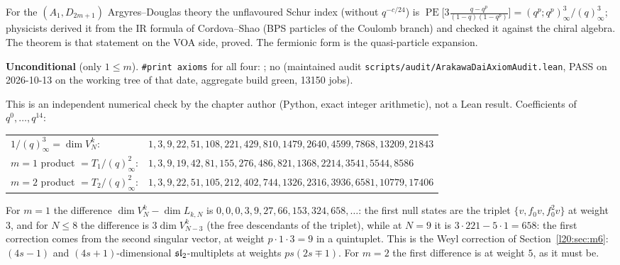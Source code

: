 \begin{physics}
For the $(A_1,D_{2m+1})$ Argyres--Douglas theory the unflavoured Schur index (without $q^{-c/24}$) is
$\operatorname{PE}\bigl[3\frac{q-q^p}{(1-q)(1-q^p)}\bigr]=(q^p;q^p)^3_\infty/(q)^3_\infty$; physicists derived it from
the IR formula of Cordova--Shao (BPS particles of the Coulomb branch) and checked it against the chiral algebra.
The theorem is that statement on the VOA side, proved. The fermionic form is the quasi-particle expansion.
\end{physics}

\begin{status}
\textbf{Unconditional} (only $1\le m$). \texttt{\#print axioms} for all four:
; no  (maintained audit
\texttt{scripts/audit/ArakawaDaiAxiomAudit.lean}, PASS on 2026-10-13 on the working tree of that date,
aggregate build green, 13150 jobs).
\end{status}

\begin{example}[The numbers for $m=1,2$]\label{l20:ex:numbers}
This is an independent numerical check by the chapter author (Python, exact integer arithmetic), not a Lean
result. Coefficients of $q^0,\dots,q^{14}$:
\begin{center}\small
\begin{tabular}{l@{\ }l}
$1/(q)_\infty^3=\dim V^k_N$: & $1,3,9,22,51,108,221,429,810,1479,2640,4599,7868,13209,21843$\\
$m=1$ product $=T_1/(q)^2_\infty$: & $1,3,9,19,42,81,155,276,486,821,1368,2214,3541,5544,8586$\\
$m=2$ product $=T_2/(q)^2_\infty$: & $1,3,9,22,51,105,212,402,744,1326,2316,3936,6581,10779,17406$
\end{tabular}
\end{center}
For $m=1$ the difference $\dim V^k_N-\dim L_{k,N}$ is $0,0,0,3,9,27,66,153,324,658,\dots$: the first null
states are the triplet $\{v,f_0v,f_0^2v\}$ at weight $3$, and for $N\le8$ the difference is $3\dim V^k_{N-3}$
(the free descendants of the triplet), while at $N=9$ it is $3\cdot221-5\cdot1=658$: the first correction comes
from the second singular vector, at weight $p\cdot1\cdot3=9$ in a quintuplet. This is the Weyl correction of
Section~\ref{l20:sec:m6}: $(4s-1)$ and $(4s+1)$-dimensional $\mathfrak{sl}_2$-multiplets at weights $ps(2s\mp1)$.
For $m=2$ the first difference is at weight $5$, as it must be.
\end{example}

